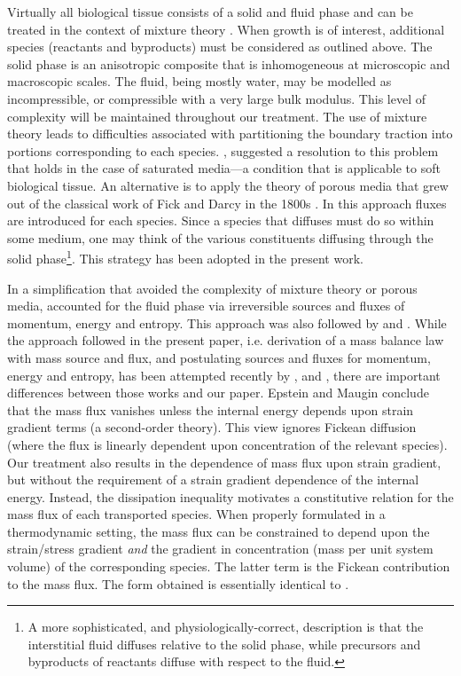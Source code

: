 Virtually all biological tissue consists of a solid and fluid
phase and can be treated in the context of mixture theory
\citep{TruesdellToupin:60,TruesdellNoll:65,BedfordDrumheller:1983}.
When growth is of interest, additional species (reactants and
byproducts) must be considered as outlined above. The solid phase
is an anisotropic composite that is inhomogeneous at microscopic
and macroscopic scales. The fluid, being mostly water, may be
modelled as incompressible, or compressible with a very large bulk
modulus. This level of complexity will be maintained throughout
our treatment. The use of mixture theory leads to difficulties
associated with partitioning the boundary traction into portions
corresponding to each species. \cite{RajagopalWineman:1990},
suggested a resolution to this problem that holds in the case of
saturated media---a condition that is applicable to soft
biological tissue. An alternative is to apply the theory of porous
media that grew out of the classical work of Fick and Darcy in the
1800s \citep{Terzaghi:1943,deBoer:2000}. In this approach fluxes
are introduced for each species. Since a species that diffuses
must do so within some medium, one may think of the various
constituents diffusing through the solid phase\footnote{A more
sophisticated, and physiologically-correct, description is that
the interstitial fluid diffuses relative to the solid phase, while
precursors and byproducts of reactants diffuse with respect to the
fluid.}. This strategy has been adopted in the present work.


In a simplification that avoided the complexity of mixture theory
or porous media, \cite{CowinHegedus:76} accounted for the fluid
phase via irreversible sources and fluxes of momentum, energy and
entropy. This approach was also followed by
\cite{EpsteinMaugin:2000} and \cite{KuhlSteinmann:02}. While the
approach followed in the present paper, i.e. derivation of a mass
balance law with mass source and flux, and postulating sources and
fluxes for momentum, energy and entropy, has been attempted
recently by \cite{EpsteinMaugin:2000}, and
\cite{KuhlSteinmann:02}, there are important differences between
those works and our paper. Epstein and Maugin conclude that the
mass flux vanishes unless the internal energy depends upon strain
gradient terms (a second-order theory). This view ignores Fickean
diffusion (where the flux is linearly dependent upon concentration
of the relevant species). Our treatment also results in the
dependence of mass flux upon strain gradient, but without the
requirement of a strain gradient dependence of the internal
energy. Instead, the dissipation inequality motivates a
constitutive relation for the mass flux of each transported
species. When properly formulated in a thermodynamic setting, the
mass flux can be constrained to depend upon the strain/stress
gradient \emph{and} the gradient in concentration (mass per unit
system volume) of the corresponding species. The latter term is
the Fickean contribution to the mass flux. The form obtained is
essentially identical to \cite{DeGrootMazur:1984}.

